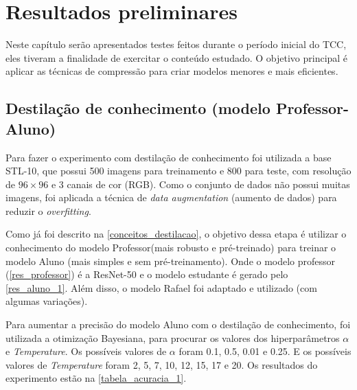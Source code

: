 \chapter{Resultados preliminares}

Neste capítulo serão apresentados testes feitos durante o período inicial do TCC, eles tiveram a finalidade de
exercitar o conteúdo estudado.
O objetivo principal é aplicar as técnicas de compressão para criar modelos menores e mais eficientes.

\section{Destilação de conhecimento (modelo Professor-Aluno)}
Para fazer o experimento com destilação de conhecimento foi utilizada a base STL-10, que possui 500 imagens para
treinamento e 800 para teste, com resolução de $96 \times 96$ e 3 canais de cor (RGB). Como o conjunto de dados
não possui muitas imagens, foi aplicada a técnica de \textit{data augmentation} (aumento de dados) para reduzir o
\textit{overfitting}.

Como já foi descrito na \autoref{conceitos_destilacao}, o objetivo dessa etapa é utilizar o conhecimento do modelo
Professor(mais robusto e pré-treinado) para treinar o modelo Aluno (mais simples e sem pré-treinamento).
Onde o modelo professor (\autoref{res_professor}) é a ResNet-50  \cite{resnet} e o modelo estudante é gerado pelo
\autoref{res_aluno_1}.
Além disso, o modelo Rafael \cite{rafael} foi adaptado e utilizado (com algumas variações).

Para aumentar a precisão do modelo Aluno com o destilação de conhecimento, foi utilizada a otimização
Bayesiana, para procurar os valores dos hiperparâmetros $\alpha$ e \textit{Temperature}.
Os possíveis valores de $\alpha$ foram 0.1, 0.5, 0.01 e 0.25.
E os possíveis valores de \textit{Temperature} foram 2, 5, 7, 10, 12, 15, 17 e 20.
Os resultados do experimento estão na \autoref{tabela_acuracia_1}.

